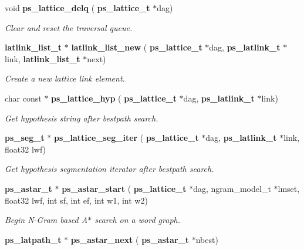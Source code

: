 \begin{DoxyCompactItemize}
\mbox{\label{ps__lattice__internal_8h_ad128ca75e8bc7ca4ba41094fb5b68ee9}} 
void \textbf{ ps\+\_\+lattice\+\_\+delq} (\textbf{ ps\+\_\+lattice\+\_\+t} $\ast$dag)
\begin{DoxyCompactList}\small\item\em Clear and reset the traversal queue. \end{DoxyCompactList}\item 
\mbox{\label{ps__lattice__internal_8h_a7197508af770064ea825bb812dd6eddc}} 
\textbf{ latlink\+\_\+list\+\_\+t} $\ast$ \textbf{ latlink\+\_\+list\+\_\+new} (\textbf{ ps\+\_\+lattice\+\_\+t} $\ast$dag, \textbf{ ps\+\_\+latlink\+\_\+t} $\ast$link, \textbf{ latlink\+\_\+list\+\_\+t} $\ast$next)
\begin{DoxyCompactList}\small\item\em Create a new lattice link element. \end{DoxyCompactList}\item 
\mbox{\label{ps__lattice__internal_8h_a02b07c009d23b852bd4db54700dfac5b}} 
char const  $\ast$ \textbf{ ps\+\_\+lattice\+\_\+hyp} (\textbf{ ps\+\_\+lattice\+\_\+t} $\ast$dag, \textbf{ ps\+\_\+latlink\+\_\+t} $\ast$link)
\begin{DoxyCompactList}\small\item\em Get hypothesis string after bestpath search. \end{DoxyCompactList}\item 
\mbox{\label{ps__lattice__internal_8h_afedbc5558c18f7d029e84a4e27e38187}} 
\textbf{ ps\+\_\+seg\+\_\+t} $\ast$ \textbf{ ps\+\_\+lattice\+\_\+seg\+\_\+iter} (\textbf{ ps\+\_\+lattice\+\_\+t} $\ast$dag, \textbf{ ps\+\_\+latlink\+\_\+t} $\ast$link, float32 lwf)
\begin{DoxyCompactList}\small\item\em Get hypothesis segmentation iterator after bestpath search. \end{DoxyCompactList}\item 
\textbf{ ps\+\_\+astar\+\_\+t} $\ast$ \textbf{ ps\+\_\+astar\+\_\+start} (\textbf{ ps\+\_\+lattice\+\_\+t} $\ast$dag, ngram\+\_\+model\+\_\+t $\ast$lmset, float32 lwf, int sf, int ef, int w1, int w2)
\begin{DoxyCompactList}\small\item\em Begin N-\/\+Gram based A$\ast$ search on a word graph. \end{DoxyCompactList}\item 
\textbf{ ps\+\_\+latpath\+\_\+t} $\ast$ \textbf{ ps\+\_\+astar\+\_\+next} (\textbf{ ps\+\_\+astar\+\_\+t} $\ast$nbest)

\end{DoxyCompactItemize}
